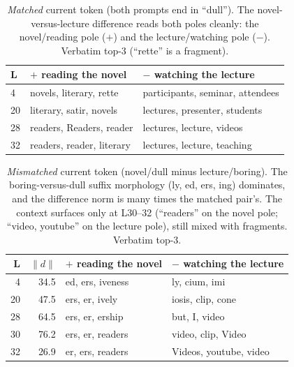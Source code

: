 \documentclass[11pt]{article}
\begin{document}
\begin{table}[htbp]
\centering
\small
\begin{tabular}{@{}lll@{}}
\toprule
L & $+$ reading the novel & $-$ watching the lecture \\
\midrule
4  & novels, literary, rette   & participants, seminar, attendees \\
20 & literary, satir, novels   & lectures, presenter, students \\
28 & readers, Readers, reader  & lectures, lecture, videos \\
32 & readers, reader, literary & lectures, lecture, teaching \\
\bottomrule
\end{tabular}
\caption{\emph{Matched} current token (both prompts end in ``dull''). The
novel-versus-lecture difference reads both poles cleanly: the novel/reading pole
($+$) and the lecture/watching pole ($-$). Verbatim top-3 (``rette'' is a
fragment).}
\label{tab:currenttoken-matched}
\end{table}

\begin{table}[htbp]
\centering
\small
\begin{tabular}{@{}rrll@{}}
\toprule
L & $\lVert d\rVert$ & $+$ reading the novel & $-$ watching the lecture \\
\midrule
4  & 34.5 & ed, ers, iveness  & ly, cium, imi \\
20 & 47.5 & ers, er, ively    & iosis, clip, cone \\
28 & 64.5 & ers, er, ership   & but, I, video \\
30 & 76.2 & ers, er, readers  & video, clip, Video \\
32 & 26.9 & er, ers, readers  & Videos, youtube, video \\
\bottomrule
\end{tabular}
\caption{\emph{Mismatched} current token (novel/dull minus lecture/boring). The
boring-versus-dull suffix morphology (ly, ed, ers, ing) dominates, and the
difference norm is many times the matched pair's. The context surfaces only at
L30--32 (``readers'' on the novel pole; ``video, youtube'' on the lecture pole),
still mixed with fragments. Verbatim top-3.}
\label{tab:currenttoken-mismatch}
\end{table}
\end{document}
